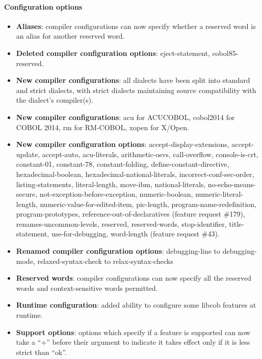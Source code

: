 \paragraph{Configuration options}
\begin{itemize}
\item \textbf{Aliases}: compiler configurations can now specify whether a reserved word is an alias for another reserved word.
\item \textbf{Deleted compiler configuration options}: eject-statement, cobol85-reserved.
\item \textbf{New compiler configurations}: all dialects have been split into standard and strict dialects, with strict dialects maintaining source compatibility with the dialect's compiler(s).
\item \textbf{New compiler configurations}: acu for ACUCOBOL, cobol2014 for COBOL 2014, rm for RM-COBOL, xopen for X\slash{}Open.
\item \textbf{New compiler configuration options}: accept-display-extensions, accept-update, accept-auto, acu-literals, arithmetic-osvs, call-overflow, console-is-crt, constant-01, constant-78, constant-folding, define-constant-directive, hexadecimal-boolean, hexadecimal-national-literals, incorrect-conf-sec-order, listing-statements, literal-length, move-ibm, national-literals, no-echo-means-secure, not-exception-before-exception, numeric-boolean, numeric-literal-length, numeric-value-for-edited-item, pic-length, program-name-redefinition, program-prototypes, reference-out-of-declaratives (feature request \#179), renames-uncommon-levels, reserved, reserved-words, stop-identifier, title-statement, use-for-debugging, word-length (feature request \#43).
\item \textbf{Renamed compiler configuration options}: debugging-line to debugging-mode, relaxed-syntax-check to relax-syntax-checks
\item \textbf{Reserved words}: compiler configurations can now specify all the reserved words and context-sensitive words permitted.
\item \textbf{Runtime configuration}: added ability to configure some libcob features at runtime.
\item \textbf{Support options}: options which specify if a feature is supported can now take a ``+'' before their argument to indicate it takes effect only if it is less strict than ``ok''.
\end{itemize}


